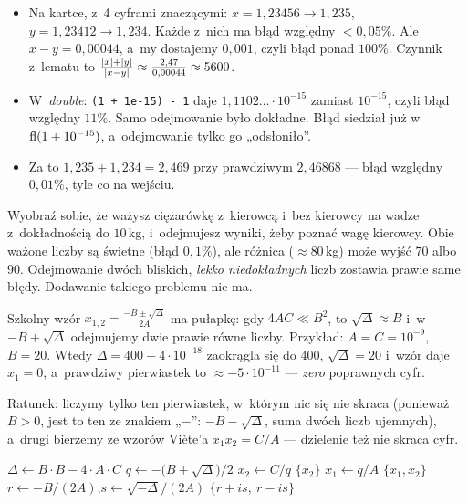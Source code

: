 \documentclass[11pt]{article}
\begin{document}
\begin{przyklad}
\begin{itemize}
\item Na kartce, z~4 cyframi znaczącymi: $x=1{,}23456\to1{,}235$,
$y=1{,}23412\to1{,}234$. Każde z~nich ma błąd względny $<0{,}05\%$.
Ale $x-y=0{,}00044$, a~my dostajemy $0{,}001$, czyli błąd ponad
$100\%$. Czynnik z~lematu to
$\frac{\left\lvert x \right\rvert+\left\lvert y \right\rvert}{\left\lvert x-y \right\rvert}\approx\frac{2{,}47}{0{,}00044}\approx5600$.
\item W~\emph{double}: \texttt{(1 + 1e-15) - 1} daje
$1{,}1102\ldots\cdot10^{-15}$ zamiast $10^{-15}$, czyli błąd względny
$11\%$. Samo odejmowanie było dokładne. Błąd siedział już w~$\operatorname{fl}(1+10^{-15})$,
a~odejmowanie tylko go „odsłoniło”.
\item Za to $1{,}235+1{,}234=2{,}469$ przy prawdziwym $2{,}46868$ ---
błąd względny $0{,}01\%$, tyle co na wejściu.
\end{itemize}
\end{przyklad}

\begin{poludzku}
Wyobraź sobie, że ważysz ciężarówkę z~kierowcą i~bez kierowcy na wadze
z~dokładnością do $10$\,kg, i~odejmujesz wyniki, żeby poznać wagę
kierowcy. Obie ważone liczby są świetne (błąd $0{,}1\%$), ale różnica
($\approx80$\,kg) może wyjść $70$ albo $90$. Odejmowanie dwóch bliskich,
\emph{lekko niedokładnych} liczb zostawia prawie same błędy. Dodawanie
takiego problemu nie ma.
\end{poludzku}

\begin{intuicja}
Szkolny wzór $x_{1,2}=\frac{-B\pm\sqrt{\Delta}}{2A}$ ma pułapkę: gdy
$4AC\ll B^2$, to $\sqrt\Delta\approx B$ i~w~$-B+\sqrt\Delta$ odejmujemy dwie
prawie równe liczby. Przykład: $A=C=10^{-9}$, $B=20$. Wtedy
$\Delta=400-4\cdot10^{-18}$ zaokrągla się do $400$, $\sqrt\Delta=20$
i~wzór daje $x_1=0$, a~prawdziwy pierwiastek to $\approx-5\cdot10^{-11}$
--- \emph{zero} poprawnych cyfr.

Ratunek: liczymy tylko ten pierwiastek, w~którym nic się nie skraca
(ponieważ $B>0$, jest to ten ze znakiem „$-$”: $-B-\sqrt\Delta$, suma dwóch
liczb ujemnych), a~drugi bierzemy ze wzorów Viète'a $x_1x_2=C/A$ --- dzielenie
też nie skraca cyfr.
\end{intuicja}

\formalnie
\begin{algorithm}[H]
\caption{Pierwiastki $Ax^2+Bx+C=0$, $B>10$}
\begin{algorithmic}[1]
\State $\Delta\gets B\cdot B-4\cdot A\cdot C$
  \State $q\gets-\bigl(B+\sqrt\Delta\bigr)/2$ 
  \State $x_2\gets C/q$
   \Return $\{x_2\}$ 
  \EndIf
  \State $x_1\gets q/A$
  \State \Return $\{x_1,x_2\}$
\Else
  \State $r\gets-B/(2A)$,\quad $s\gets\sqrt{-\Delta}/(2A)$
  \State \Return $\{r+is,\ r-is\}$
\EndIf
\end{algorithmic}
\end{algorithm}
\end{document}
